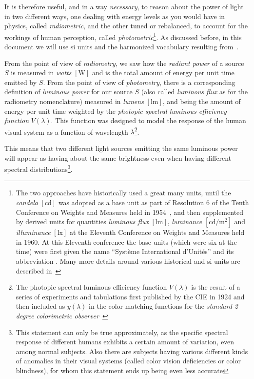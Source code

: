 It is therefore useful, and in a way \emph{necessary}, to reason about the power 
of light in two different ways, one dealing with energy levels as you would have in 
physics, called \textsl{radiometric}, and the other tuned or rebalanced, to account 
for the workings of human perception, called \textsl{photometric}\footnote{ 
The two approaches have historically used a great many units, 
until the \textsl{\gls{candela}} $[\unit\candela]$ was adopted as a base unit 
as part of Resolution 6 of the Tenth Conference on Weights and Measures
held in 1954~\cite[p. 163]{bipm:si.2019}, and then supplemented by derived units for
quantities \textsl{\gls{luminous flux}} $[\unit\lumen]$, 
\textsl{\gls{luminance}} $[\unit{\candela\per\square\meter}]$ 
and \textsl{\gls{illuminance}} $[\unit\lux]$ at the Eleventh Conference on Weights 
and Measures held in 1960.  
At this Eleventh conference the base units (which were six at the time) were first
given the name ``Syst\`eme International d’Unit\'es” and its abbreviation .
Many more details around various historical and \gls{si} units are
described in~\cite{Meyer-Arendt:68}}. 
As discussed before, in this document we will use \gls{si} units and the harmonized 
vocabulary resulting from~\cite{iso:80000-7:2019,cie:s017.2020,iec:60050-845:2020}.

From the point of view of \textsl{\gls{radiometry}}, we saw how the \textsl{radiant power} 
of a source $S$ is measured in \textit{watts} $[\unit{\watt}]$ and is the total amount 
of energy per unit time emitted by $S$.
From the point of view of \textsl{\gls{photometry}}, there is a corresponding definition
of \textsl{luminous power} for our source $S$ (also called \textsl{luminous flux} as for the 
radiometry nomenclature) measured in \textit{lumens} $[\unit{\lumen}]$, and being the 
amount of energy per unit time weighted by the \textsl{photopic spectral luminous efficiency 
function} $V(\lambda)$. 
This function was designed to model the response of the human visual system as a function of 
wavelength $\lambda$\footnote{
	The photopic spectral luminous efficiency function $V(\lambda)$ is the result of a 
	series of experiments and tabulations first published by the \gls{CIE} in 1924 
	and then included as $\bar y(\lambda)$ in the color matching functions for 
	the \emph{standard 2 degree colorimetric observer}~\cite{smithguild1931}}.

This means that two different light sources emitting the same luminous
power will appear as having about the same brightness even when having
different spectral distributions\footnote{This
	statement can only be true approximately, as the specific spectral response
	of different humans exhibits a certain amount of variation, even among normal 
	subjects.
	Also there are subjects having various different kinds of anomalies in their
	visual systems (called color vision deficiencies or color blindness), 
	for whom this statement ends up being even less accurate}.

